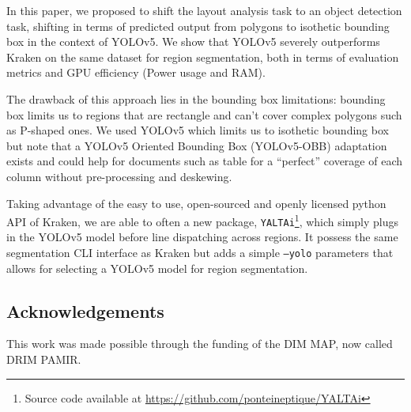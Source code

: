 \documentclass{jdmdh}
\begin{document}
In this paper, we proposed to shift the layout analysis task to an object detection task, shifting in terms of predicted output from polygons to isothetic bounding box in the context of YOLOv5. We show that YOLOv5 severely outperforms Kraken on the same dataset for region segmentation, both in terms of evaluation metrics and GPU efficiency (Power usage and RAM).

The drawback of this approach lies in the bounding box limitations: bounding box limits us to regions that are rectangle and can't cover complex polygons such as P-shaped ones. We used YOLOv5 which limits us to isothetic bounding box but note that a YOLOv5 Oriented Bounding Box (YOLOv5-OBB) adaptation exists and could help for documents such as table for a ``perfect'' coverage of each column without pre-processing and deskewing.

Taking advantage of the easy to use, open-sourced and openly licensed python API of Kraken, we are able to often a new package, \texttt{YALTAi}\footnote{Source code available at \url{https://github.com/ponteineptique/YALTAi}}, which simply plugs in the YOLOv5 model before line dispatching across regions. It possess the same segmentation CLI interface as Kraken but adds a simple \texttt{--yolo} parameters that allows for selecting a YOLOv5 model for region segmentation.

\subsection{Acknowledgements}

This work was made possible through the funding of the DIM MAP, now called DRIM PAMIR.



\end{document}
